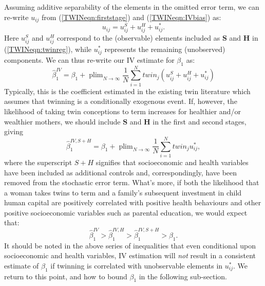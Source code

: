 \documentclass[subeqn]{article}
\DeclareMathOperator{\plim}{plim}
\begin{document}
\begin{spacing}{1.4}
Assuming additive separability of the elements in the omitted error term, we can 
re-write $u_{ij}$ from (\ref{TWINeqn:firststage}) and (\ref{TWINeqn:IVbias}) as:
\[ u_{ij}=u^S_{ij}+u^H_{ij}+u^*_{ij}. \]
Here $u^S_{ij}$ and $u^H_{ij}$ correspond to the (observable) elements included 
as $\bm{S}$ and $\bm{H}$ in (\ref{TWINeqn:twinreg}), while $u^*_{ij}$ represents 
the remaining (unobserved) components.  We can thus re-write our IV estimate for 
$\beta_1$ as:
\begin{equation}
\label{TWINeqn:betabias}
\hat\beta_1^{IV} = \beta_1 + 
\plim_{N\to \infty} \frac{1}{N}\sum_{i=1}^N twin_j(u^S_{ij}+u^H_{ij}+u^*_{ij})
\end{equation}
Typically, this is the coefficient estimated in the existing twin literature 
which assumes that twinning is a conditionally exogenous event.  If, however, the 
likelihood of taking twin conceptions to term increases for healthier and/or 
wealthier mothers, we should include $\bm{S}$ and $\bm{H}$ in the first and 
second stages, giving
\begin{equation}
\label{TWINeqn:betacloser}
\hat\beta_1^{IV,S+H} = \beta_1 +
\plim_{N\to \infty} \frac{1}{N}\sum_{i=1}^N twin_ju^*_{ij},
\end{equation}
where the superscript $S+H$ signifies that socioeconomic and health variables 
have been included as additional controls and, correspondingly, have been 
removed from the stochastic error term.  What's more, if both the likelihood
that a woman takes twins to term and a family's subsequent investment in child 
human capital are positively correlated with positive health behaviours and other 
positive socioeconomic variables such as parental education, we would expect that:
\begin{equation}
\label{TWINeqn:moves}
\hat\beta_1^{IV}>\hat\beta_1^{IV,H}>\hat\beta_1^{IV,S+H}>\beta_1.
\end{equation}
It should be noted in the above series of inequalities that even conditional upon
socioeconomic and health variables, IV estimation will \emph{not} result in a
consistent estimate of $\beta_1$ if twinning is correlated with unobservable
elements in $u^*_{ij}$.  We return to this point, and how to bound $\beta_1$ in
the following sub-section.


\end{spacing}
\end{document}
